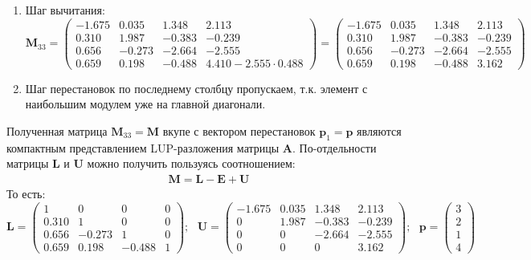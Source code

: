 \begin{enumerate}
     \item Шаг вычитания:
     \[\mathbf{M}_{33} =
     \begin{pmatrix}
       -1.675&  0.035&   1.348&   2.113\\
        0.310&  1.987&  -0.383&  -0.239\\
        0.656& -0.273&  -2.664&  \mathbf{-2.555}\\
        0.659&  0.198&  \mathbf{-0.488}&   4.410-2.555\cdot0.488
     \end{pmatrix} =
     \begin{pmatrix}
       -1.675&  0.035&   1.348&   2.113\\
        0.310&  1.987&  -0.383&  -0.239\\
        0.656& -0.273&  -2.664&  -2.555\\
        0.659&  0.198&  -0.488&   3.162
     \end{pmatrix}\]

     \item Шаг перестановок по последнему столбцу пропускаем, т.к. элемент с наибольшим модулем уже на главной диагонали.
\end{enumerate}
Полученная матрица $\mathbf{M}_{33}=\mathbf{M}$ вкупе с вектором перестановок $\mathbf{p}_1=\mathbf{p}$ являются компактным представлением LUP-разложения матрицы $\mathbf{A}$. По-отдельности матрицы $\mathbf{L}$ и $\mathbf{U}$ можно получить пользуясь соотношением:
\begin{align}
    \mathbf{M} = \mathbf{L} - \mathbf{E} + \mathbf{U}
\end{align}
То есть:
\begin{equation}
    \mathbf{L} =
    \begin{pmatrix}
        1    &  0    &   0    &   0\\
        0.310&  1    &   0    &   0\\
        0.656& -0.273&   1    &   0\\
        0.659&  0.198&  -0.488&   1
    \end{pmatrix};~~~\mathbf{U} =
    \begin{pmatrix}
       -1.675&  0.035&   1.348&   2.113\\
        0    &  1.987&  -0.383&  -0.239\\
        0    &  0    &  -2.664&  -2.555\\
        0    &  0    &   0    &   3.162
    \end{pmatrix};~~~
    \mathbf{p} = \begin{pmatrix} 3 \\ 2 \\ 1 \\ 4  \end{pmatrix}
\end{equation}


